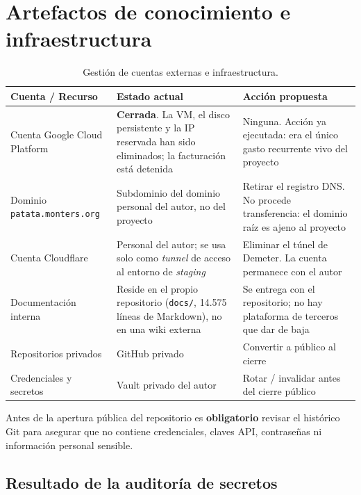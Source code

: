 \section{Artefactos de conocimiento e infraestructura}

\begin{table}[H]
    \centering
    \caption{Gesti\'on de cuentas externas e infraestructura.}
    \label{tab:cuentas}
    \begin{tabular}{p{3.5cm}p{4cm}p{5cm}}
        \toprule
        \textbf{Cuenta / Recurso} & \textbf{Estado actual} & \textbf{Acci\'on propuesta} \\
        \midrule
        Cuenta Google Cloud Platform & \textbf{Cerrada}. La VM, el disco persistente y la IP reservada han sido eliminados; la facturaci\'on est\'a detenida & Ninguna. Acci\'on ya ejecutada: era el \'unico gasto recurrente vivo del proyecto \\
        Dominio \texttt{patata.monters.org} & Subdominio del dominio personal del autor, no del proyecto & Retirar el registro DNS. No procede transferencia: el dominio ra\'iz es ajeno al proyecto \\
        Cuenta Cloudflare            & Personal del autor; se usa solo como \textit{tunnel} de acceso al entorno de \textit{staging} & Eliminar el t\'unel de Demeter. La cuenta permanece con el autor \\
        Documentaci\'on interna      & Reside en el propio repositorio (\texttt{docs/}, 14.575 l\'ineas de Markdown), no en una wiki externa & Se entrega con el repositorio; no hay plataforma de terceros que dar de baja \\
        Repositorios privados        & GitHub privado          & Convertir a p\'ublico al cierre \\
        Credenciales y secretos      & Vault privado del autor & Rotar / invalidar antes del cierre p\'ublico \\
        \bottomrule
    \end{tabular}
\end{table}

\begin{warningbox}
Antes de la apertura p\'ublica del repositorio es \textbf{obligatorio}
revisar el hist\'orico Git para asegurar que no contiene credenciales,
claves API, contrase\~nas ni informaci\'on personal sensible.
\end{warningbox}

\subsection*{Resultado de la auditor\'ia de secretos}

